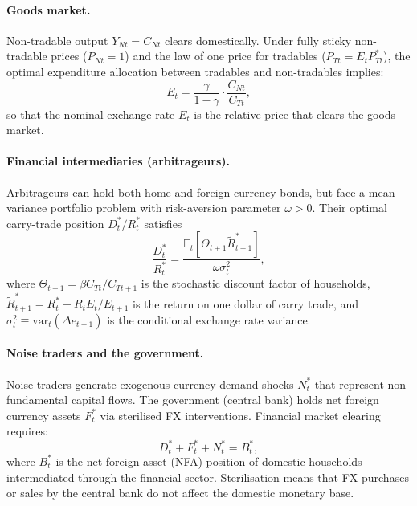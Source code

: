 \documentclass[12pt,a4paper]{article}
\begin{document}
\paragraph{Goods market.} Non-tradable output $Y_{Nt} = C_{Nt}$ clears domestically. Under fully sticky non-tradable prices ($P_{Nt} = 1$) and the law of one price for tradables ($P_{Tt} = E_t P^*_{Tt}$), the optimal expenditure allocation between tradables and non-tradables implies:
\begin{equation}
    E_t = \frac{\gamma}{1-\gamma} \cdot \frac{C_{Nt}}{C_{Tt}},
    \label{eq:expenditure}
\end{equation}
so that the nominal exchange rate $E_t$ is the relative price that clears the goods market. %

\paragraph{Financial intermediaries (arbitrageurs).} Arbitrageurs can hold both home and foreign currency bonds, but face a mean-variance portfolio problem with risk-aversion parameter $\omega > 0$. Their optimal carry-trade position $D^*_t/R^*_t$ satisfies
\begin{equation}
    \frac{D^*_t}{R^*_t} = \frac{\mathbb{E}_t[\Theta_{t+1}\tilde{R}^*_{t+1}]}{\omega \sigma^2_t},
    \label{eq:arbitrageur}
\end{equation}
where $\Theta_{t+1} = \beta C_{Tt}/C_{Tt+1}$ is the stochastic discount factor of households, $\tilde{R}^*_{t+1} = R^*_t - R_t E_t/E_{t+1}$ is the return on one dollar of carry trade, and $\sigma^2_t \equiv \text{var}_t(\Delta e_{t+1})$ is the conditional exchange rate variance. %

\paragraph{Noise traders and the government.} Noise traders generate exogenous currency demand shocks $N^*_t$ that represent non-fundamental capital flows. The government (central bank) holds net foreign currency assets $F^*_t$ via sterilised FX interventions. Financial market clearing requires:
\begin{equation}
    D^*_t + F^*_t + N^*_t = B^*_t,
    \label{eq:fmclearing}
\end{equation}
where $B^*_t$ is the net foreign asset (NFA) position of domestic households intermediated through the financial sector. Sterilisation means that FX purchases or sales by the central bank do not affect the domestic monetary base.%
\end{document}
